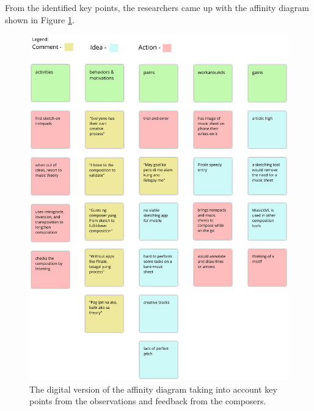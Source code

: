 		From the identified key points, the researchers came up with the affinity diagram shown in Figure \ref{fig:affinity-diagram}. 

		\begin{figure}[H]
			\centering
			\includegraphics[scale=0.45]{figures/affinity_diagram.png}
		    \caption{The digital version of the affinity diagram taking into account key points from the observations and feedback from the composers. }
		    \label{fig:affinity-diagram}
		\end{figure} 

